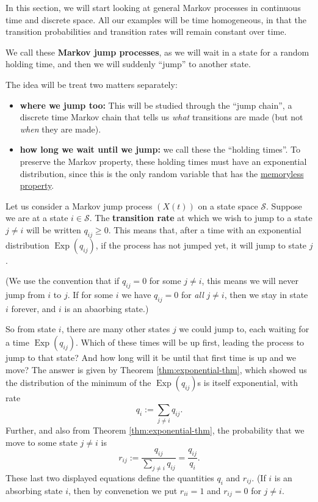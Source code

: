 \documentclass[
  a4paper,
]{article}
\providecommand{\tightlist}{%
  \setlength{\itemsep}{0pt}\setlength{\parskip}{0pt}}
\theoremstyle{definition}
\theoremstyle{definition}
\theoremstyle{definition}
\theoremstyle{remark}
\begin{document}
In this section, we will start looking at general Markov processes in continuous time and discrete space. All our examples will be time homogeneous, in that the transition probabilities and transition rates will remain constant over time.

We call these \textbf{Markov jump processes}, as we will wait in a state for a random holding time, and then we will suddenly ``jump'' to another state.

The idea will be treat two matters separately:

\begin{itemize}
\tightlist
\item
  \textbf{where we jump too:} This will be studied through the ``jump chain'', a discrete time Markov chain that tells us \emph{what} transitions are made (but not \emph{when} they are made).
\item
  \textbf{how long we wait until we jump:} we call these the ``holding times''. To preserve the Markov property, these holding times must have an exponential distribution, since this is the only random variable that has the \protect\hyperlink{memoryless-thm}{memoryless property}.
\end{itemize}

Let us consider a Markov jump process \((X(t))\) on a state space \(\mathcal S\). Suppose we are at a state \(i \in \mathcal S\). The \textbf{transition rate} at which we wish to jump to a state \(j \neq i\) will be written \(q_{ij} \geq 0\). This means that, after a time with an exponential distribution \(\operatorname{Exp}(q_{ij})\), if the process has not jumped yet, it will jump to state \(j\).

(We use the convention that if \(q_{ij} = 0\) for some \(j \neq i\), this means we will never jump from \(i\) to \(j\). If for some \(i\) we have \(q_{ij} = 0\) for \emph{all} \(j \neq i\), then we stay in state \(i\) forever, and \(i\) is an abaorbing state.)

So from state \(i\), there are many other states \(j\) we could jump to, each waiting for a time \(\operatorname{Exp}(q_{ij})\). Which of these times will be up first, leading the process to jump to that state? And how long will it be until that first time is up and we move?
The answer is given by Theorem \ref{thm:exponential-thm}, which showed us the distribution of the minimum of the \(\operatorname{Exp}(q_{ij})\)s is itself exponential, with rate
\[ q_i := \sum_{j \neq i} q_{ij} . \]
Further, and also from Theorem \ref{thm:exponential-thm}, the probability that we move to some state \(j \neq i\) is
\[ r_{ij} := \frac{q_{ij}}{\sum_{j \neq i} q_{ij}} = \frac{q_{ij}}{q_i} . \]
These last two displayed equations define the quantities \(q_i\) and \(r_{ij}\). (If \(i\) is an absorbing state \(i\), then by convenetion we put \(r_{ii} = 1\) and \(r_{ij} = 0\) for \(j \neq i\).
\end{document}
